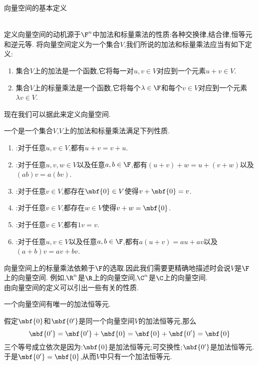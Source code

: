 \documentclass{ctexart}
\begin{document}
\pagestyle{empty}
\begin{center}\large 向量空间的基本定义\end{center}
\\
定义向量空间的动机源于$\F^n$中加法和标量乘法的性质:各种交换律,结合律,恒等元和逆元等.
将向量空间定义为一个集合$V$,我们所说的加法和标量乘法应当有如下定义:
\begin{definition}[1.1\ 定义:加法,标量乘法]
    \begin{enumerate}[label=\textbf{(\arabic*)}]
        \item 集合$V$上的加法是一个函数,它将每一对$u,v\in V$对应到一个元素$u+v\in V$.
        \item 集合$V$上的标量乘法是一个函数,它将每个$\lambda\in\F$和每个$v\in V$对应到一个元素$\lambda v\in V$.
    \end{enumerate}
\end{definition}\noindent
现在我们可以据此来定义向量空间.
\begin{definition}[1.2\ 定义:向量空间]
    一个是一个集合$V$,$V$上的加法和标量乘法满足下列性质.
    \begin{enumerate}[label=\textbf{(\arabic*)}]
        \item {}:对于任意$u,v\in V$,都有$u+v=v+u$.
        \item {}:对于任意$u,v,w\in V$以及任意$a,b\in\F$,都有$(u+v)+w=u+(v+w)$以及$(ab)v=a(bv)$.
        \item {}:对于任意$v\in V$,都存在$\mbf{0}\in V$使得$v+\mbf{0}=v$.
        \item {}:对于任意$v\in V$,都存在$w\in V$使得$v+w=\mbf{0}$.
        \item {}:对于任意$v\in V$,都有$1v=v$.
        \item {}:对于任意$u,v\in V$以及任意$a,b\in\F$,都有$a(u+v)=au+av$以及$(a+b)v=av+bv$.
    \end{enumerate}
\end{definition}\noindent
向量空间上的标量乘法依赖于$\F$的选取.因此我们需要更精确地描述时会说$V$是$\F$上的向量空间.
例如,$\R^n$是$\R$上的向量空间,$\C^n$是$\C$上的向量空间.\\
由向量空间的定义可以引出一些有关的性质.
\begin{formal}[1.3.1 加法恒等元唯一]
    一个向量空间有唯一的加法恒等元.
\end{formal}
\begin{solution}[1.3.1 Proof.]
    假定$\mbf{0}$和$\mbf{0'}$是同一个向量空间$V$的加法恒等元,那么
    $$\mbf{0'}=\mbf{0'}+\mbf{0}=\mbf{0}+\mbf{0'}=\mbf{0}$$
    三个等号成立依次是因为:$\mbf{0}$是加法恒等元;可交换性;$\mbf{0'}$是加法恒等元.\\
    于是$\mbf{0'}=\mbf{0}$,从而$V$中只有一个加法恒等元.
\end{solution}
\end{document}
